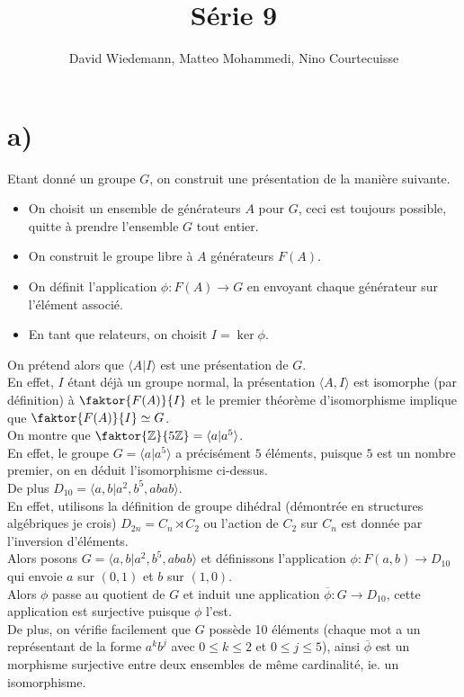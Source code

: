 \documentclass[11pt, a4paper]{article}
\begin{document}
\title{Série 9}
\author{David Wiedemann, Matteo Mohammedi, Nino Courtecuisse}
\maketitle
\section*{a)}
Etant donné un groupe $G$, on construit une présentation de la manière suivante.
\begin{itemize}
\item On choisit un ensemble de générateurs $A$  pour $G$, ceci est toujours possible, quitte à prendre l'ensemble $G$ tout entier.
\item On construit le groupe libre à $A$ générateurs $F( A) $.
\item On définit l'application $\phi: F( A) \to G$ en envoyant chaque générateur sur l'élément associé.
\item En tant que relateurs, on choisit $I= \ker \phi$.
\end{itemize}
On prétend alors que $ \langle A| I\rangle$ est une présentation de $G$.\\
En effet, $I$ étant déjà un groupe normal, la présentation $ \langle A, I\rangle$ est isomorphe (par définition) à $ \faktor { F( A) } { I} $ et le premier théorème d'isomorphisme implique que $ \faktor { F( A) } { I} \simeq G$.\\

On montre que $ \faktor { \mathbb{Z}} { 5 \mathbb{Z}} = \langle a | a^{5}\rangle $.\\
En effet, le groupe $ G =\langle a | a^{5}\rangle$ a précisément $5$ éléments, puisque $5$ est un nombre premier, on en déduit l'isomorphisme ci-dessus.\\
De plus $ D_{10} = \langle a,b | a^{2},b^{5}, abab\rangle$.\\
En effet, utilisons la définition de groupe dihédral (démontrée en structures algébriques je crois) $ D_{2n} = C_n\rtimes C_2$ ou l'action de $C_2$ sur $C_n$ est donnée par l'inversion d'éléments.\\
Alors posons $G= \langle a,b | a^{2}, b^{5}, abab\rangle$ et définissons l'application $\phi: F( a,b)  \to D_{10} $ qui envoie $a$ sur $( 0,1) $ et $b$ sur $( 1,0) $.\\
Alors $\phi$ passe au quotient de $G$ et induit une application $ \overline{\phi}: G\to D_{10}$, cette application est surjective puisque $\phi$ l'est.\\
De plus, on vérifie facilement que $G$ possède 10 éléments (chaque mot a un représentant de la forme $a^{k}b^{j}$ avec $ 0 \leq k \leq 2$ et $ 0 \leq j \leq 5$), ainsi $ \overline{\phi}$ est un morphisme surjective entre deux ensembles de même cardinalité, ie. un isomorphisme.
\end{document}
